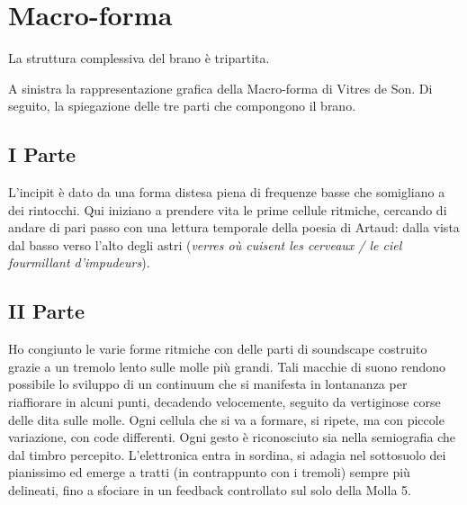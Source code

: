 
\section{Macro-forma}


La struttura complessiva del brano è tripartita. 

A sinistra la rappresentazione grafica della Macro-forma di Vitres de Son. Di seguito, la spiegazione delle tre parti che compongono il brano.

\subsection*{I Parte}

L'incipit è dato da una forma distesa piena di frequenze basse che somigliano a dei rintocchi. Qui iniziano a prendere vita le prime cellule ritmiche, cercando di andare di pari passo con una lettura temporale della poesia di Artaud: dalla vista dal basso verso l'alto degli astri (\textit{verres où cuisent les cerveaux / le ciel fourmillant d'impudeurs}).


\subsection*{II Parte}

Ho congiunto le varie forme ritmiche con delle parti di soundscape costruito grazie a un tremolo lento sulle molle più grandi. Tali macchie di suono rendono possibile lo sviluppo di un continuum che si manifesta in lontananza per riaffiorare in alcuni punti, decadendo velocemente, seguito da vertiginose corse delle dita sulle molle. Ogni cellula che si va a formare, si ripete, ma con piccole variazione, con code differenti. Ogni gesto è riconosciuto sia nella semiografia che dal timbro percepito. L'elettronica entra in sordina, si adagia nel sottosuolo dei pianissimo ed emerge a tratti (in contrappunto con i tremoli) sempre più delineati, fino a sfociare in un feedback controllato sul solo della Molla 5. 


